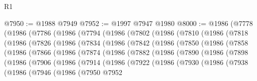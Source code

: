 \begin{lexlean}{R1}
\begin{coremodule}
@7950 := @1988 @7949
@7952 := @1997 @7947 @1980
@8000 := @1986
    (@7778
      (@1986
        (@7786
          (@1986
            (@7794
              (@1986
                (@7802
                  (@1986
                    (@7810
                      (@1986
                        (@7818
                          (@1986
                            (@7826
                              (@1986
                                (@7834
                                  (@1986
                                    (@7842
                                      (@1986
                                        (@7850
                                          (@1986
                                            (@7858
                                              (@1986
                                                (@7866
                                                  (@1986
                                                    (@7874
                                                      (@1986
                                                        (@7882
                                                          (@1986
                                                            (@7890
                                                              (@1986
                                                                (@7898
                                                                  (@1986
                                                                    (@7906
                                                                      (@1986
                                                                        (@7914
                                                                          (@1986
                                                                            (@7922
                                                                              (@1986
                                                                                (@7930
                                                                                  (@1986
                                                                                    (@7938
                                                                                      (@1986
                                                                                        (@7946
                                                                                          (@1986
                                                                                            (@7950
                                                                                              @7952

\end{coremodule}
\end{lexlean}
